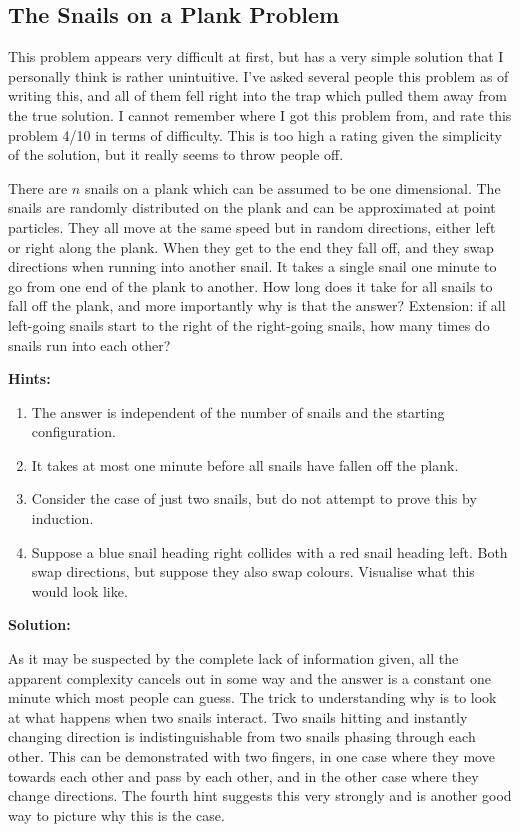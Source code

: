 \subsection{The Snails on a Plank Problem}

This problem appears very difficult at first, but has a very simple solution that I personally think is rather unintuitive. I've asked several people this problem as of writing this, and all of them fell right into the trap which pulled them away from the true solution. I cannot remember where I got this problem from, and rate this problem 4/10 in terms of difficulty. This is too high a rating given the simplicity of the solution, but it really seems to throw people off.

There are $n$ snails on a plank which can be assumed to be one dimensional. The snails are randomly distributed on the plank and can be approximated at point particles. They all move at the same speed but in random directions, either left or right along the plank. When they get to the end they fall off, and they swap directions when running into another snail. It takes a single snail one minute to go from one end of the plank to another. How long does it take for all snails to fall off the plank, and more importantly why is that the answer? Extension: if all left-going snails start to the right of the right-going snails, how many times do snails run into each other?

\textbf{Hints:}

\begin{enumerate}
	\item The answer is independent of the number of snails and the starting configuration.
	\item It takes at most one minute before all snails have fallen off the plank.
	\item Consider the case of just two snails, but do not attempt to prove this by induction.
	\item Suppose a blue snail heading right collides with a red snail heading left. Both swap directions, but suppose they also swap colours. Visualise what this would look like.
\end{enumerate}

\textbf{Solution:}

As it may be suspected by the complete lack of information given, all the apparent complexity cancels out in some way and the answer is a constant one minute which most people can guess. The trick to understanding why is to look at what happens when two snails interact. Two snails hitting and instantly changing direction is indistinguishable from two snails phasing through each other. This can be demonstrated with two fingers, in one case where they move towards each other and pass by each other, and in the other case where they change directions. The fourth hint suggests this very strongly and is another good way to picture why this is the case.

